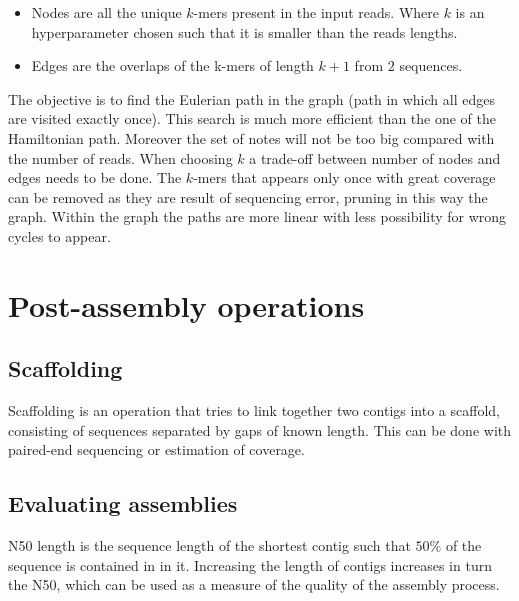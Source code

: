 \begin{multicols}{2}
    \begin{itemize}
        \item Nodes are all the unique $k$-mers present in the input reads.
            Where $k$ is an hyperparameter chosen such that it is smaller than the reads lengths.
        \item Edges are the overlaps of the k-mers of length $k+1$ from $2$ sequences.
    \end{itemize}
\end{multicols}

The objective is to find the Eulerian path in the graph (path in which all edges are visited exactly once).
This search is much more efficient than the one of the Hamiltonian path.
Moreover the set of notes will not be too big compared with the number of reads.
When choosing $k$ a trade-off between number of nodes and edges needs to be done.
The $k$-mers that appears only once with great coverage can be removed as they are result of sequencing error, pruning in this way the graph.
Within the graph the paths are more linear with less possibility for wrong cycles to appear.


\section{Post-assembly operations}

    \subsection{Scaffolding}
    Scaffolding is an operation that tries to link together two contigs into a scaffold, consisting of sequences separated by gaps of known length.
    This can be done with paired-end sequencing or estimation of coverage.

    \subsection{Evaluating assemblies}
    N50 length is the sequence length of the shortest contig such that $50\%$ of the sequence is contained in in it.
    Increasing the length of contigs increases in turn the N50, which can be used as a measure of the quality of the assembly process.
